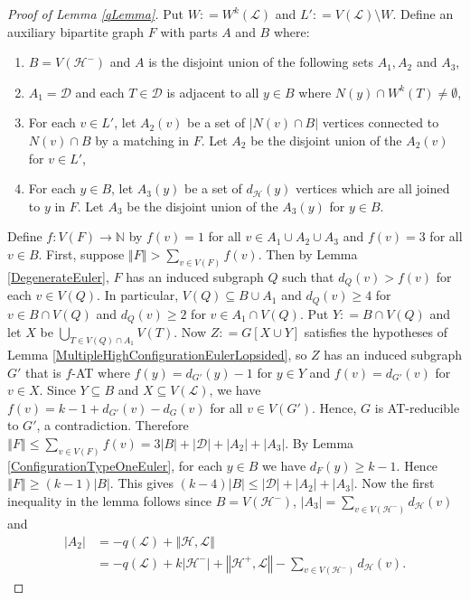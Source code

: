 \documentclass[10pt]{article}
\theoremstyle{plain}
\theoremstyle{definition}
\theoremstyle{remark}
\newcommand{\fancy}[1]{\mathcal{#1}}
\newcommand{\IN}{\mathbb{N}}
\newcommand{\D}{\fancy{D}}
\renewcommand{\L}{\fancy{L}}
\newcommand{\HH}{\fancy{H}}
\newcommand{\card}[1]{\left|#1\right|}
\newcommand{\size}[1]{\left\Vert#1\right\Vert}
\newcommand{\func}[3]{#1\colon #2 \rightarrow #3}
\newcommand{\DefinedAs}{\mathrel{\mathop:}=}
\def\D{\fancy{D}}
\begin{document}
\begin{proof}[Proof of Lemma \ref{qLemma}]
Put $W \DefinedAs W^k(\L)$ and $L' \DefinedAs V(\L) \setminus W$. Define an auxiliary bipartite graph $F$ with parts $A$ and $B$ where:
\begin{enumerate}
\item  $B = V(\HH^-)$ and $A$ is the disjoint union of the following sets
$A_1, A_2$ and $A_3$,
\item $A_1 = \D$ and each $T \in \D$ is adjacent to all $y \in B$
where $N(y) \cap W^k(T) \ne \emptyset$,
\item For each $v \in L'$, let $A_2(v)$ be a set of $\card{N(v) \cap
B}$ vertices connected to $N(v) \cap B$ by a matching in $F$.  Let
$A_2$ be the disjoint union of the $A_2(v)$ for $v \in L'$,
\item For each $y \in B$, let $A_3(y)$ be a set of $d_{\HH}(y)$ vertices
which are all joined to $y$ in $F$.  Let $A_3$ be the disjoint union
of the $A_3(y)$ for $y \in B$.
\end{enumerate}

Define $\func{f}{V(F)}{\IN}$ by $f(v) = 1$ for all $v \in A_1 \cup A_2 \cup A_3$ and $f(v) = 3$ for all $v \in B$.  First, suppose $\size{F} > \sum_{v \in V(F)} f(v)$.  
Then by Lemma \ref{DegenerateEuler}, $F$ has an induced subgraph $Q$ such that $d_Q(v) > f(v)$ for each $v \in V(Q)$.  
In particular, $V(Q) \subseteq B \cup A_1$ and $d_Q(v) \ge 4$ for $v \in B \cap V(Q)$ and $d_Q(v) \ge 2$ for $v \in A_1 \cap V(Q)$.  
Put $Y \DefinedAs B \cap V(Q)$ and let $X$ be $\bigcup_{T \in V(Q) \cap A_1} V(T)$. 
Now $Z \DefinedAs G[X \cup Y]$ satisfies the hypotheses of Lemma \ref{MultipleHighConfigurationEulerLopsided}, so $Z$ has an induced subgraph $G'$ that is $f$-AT 
where $f(y) = d_{G'}(y) - 1$ for $y \in Y$ and $f(v) = d_{G'}(v)$ for $v \in X$.  Since $Y \subseteq B$ and $X \subseteq V(\L)$, we have $f(v) = k-1 + d_{G'}(v) - d_G(v)$ for all $v \in V(G')$.  
Hence, $G$ is AT-reducible to $G'$, a contradiction.
Therefore $\size{F} \le \sum_{v \in V(F)} f(v) = 3\card{B} + \card{\D} + \card{A_2} + \card{A_3}$. 
By Lemma \ref{ConfigurationTypeOneEuler}, for each $y \in B$ we have $d_F(y) \ge k-1$.  
Hence $\size{F} \ge (k-1)\card{B}$.  This gives $(k-4)\card{B} \le \card{\D} + \card{A_2} + \card{A_3}$.  
Now the first inequality in the lemma follows since $B = V(\HH^-)$, $\card{A_3} = \sum_{v \in V(\HH^-)} d_{\HH}(v)$ and
\begin{align*}
\card{A_2} &= -q(\L) + \size{\HH, \L} \\
&= -q(\L) + k\card{\HH^-}+ \size{\HH^+, \L} - \sum_{v \in V(\HH^-)} d_{\HH}(v).
\end{align*}


\end{proof}
\end{document}
